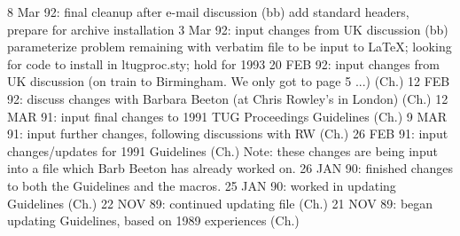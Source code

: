 \endarticle

%

 8 Mar 92: final cleanup after e-mail discussion (bb)
           add standard headers, prepare for archive installation
 3 Mar 92: input changes from UK discussion (bb)
           parameterize \MtgYear
           problem remaining with verbatim file to be input to LaTeX;
             looking for code to install in ltugproc.sty; hold for 1993
20 FEB 92: input changes from UK discussion (on train to Birmingham.
           We only got to page 5 ...) (Ch.)
12 FEB 92: discuss changes with Barbara Beeton (at Chris Rowley's
           in London) (Ch.)
12 MAR 91: input final changes to 1991 TUG Proceedings Guidelines (Ch.)
 9 MAR 91: input further changes, following discussions with RW (Ch.)
26 FEB 91: input changes/updates for 1991 Guidelines (Ch.)
           Note: these changes are being input into a file
                 which Barb Beeton has already worked on.
26 JAN 90: finished changes to both the Guidelines and the macros.
25 JAN 90: worked in updating Guidelines (Ch.)
22 NOV 89: continued updating file (Ch.)
21 NOV 89: began updating Guidelines, based on 1989 experiences (Ch.)
